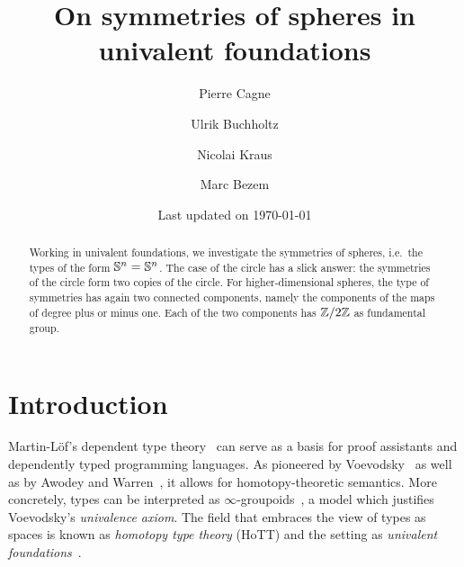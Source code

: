\documentclass[english,a4paper]{lmcs}
\begin{document}
\title{On symmetries of spheres in univalent foundations}

\author{Pierre Cagne}
\address{Universitetet i Bergen}

\author{Ulrik Buchholtz}
\address{Technische Universit\"at Darmstadt}

\author{Nicolai Kraus}
\address{University of Nottingham}

\author{Marc Bezem}
\address{Universitetet i Bergen}

\date{\normalsize Last updated on \today}%

\begin{abstract}
  Working in univalent foundations,
  we investigate the symmetries of spheres, i.e.\ the types of the form
  ${\mathbb S^{n}} = {\mathbb S^{n}}$.
  The case of the circle has a slick answer:
  the symmetries of the circle form two copies of the circle.
  For higher-dimensional spheres, the type of symmetries has again two connected components, namely the components of the maps of degree plus or minus one.
  Each of the two components has $\mathbb{Z}/2\mathbb{Z}$ as fundamental group.
\end{abstract}

\maketitle

\section{Introduction}




Martin-L\"of's dependent type theory~\cite{Martin-Lof-1972} can serve as a basis for proof assistants and dependently typed programming languages.
As pioneered by Voevodsky~\cite{voevodsky_univalentfoundations} as well as by Awodey and Warren~\cite{awodeyWarren_HTmodelsOfIT}, it allows for homotopy-theoretic semantics.
More concretely, types can be interpreted as $\infty$-groupoids~\cite{Kapulkin2021}, a model which justifies Voevodsky's \emph{univalence axiom}.
The field that embraces the view of types as spaces is known as \emph{homotopy type theory} (HoTT) and the setting as \emph{univalent foundations}~\cite{HoTT}.
\end{document}
